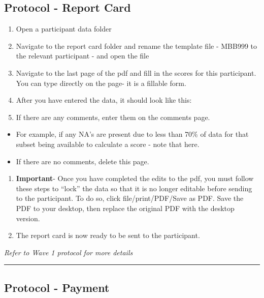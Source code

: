 \documentclass[]{book}
\begin{document}
\hypertarget{protocol---report-card-1}{%
\subsection{Protocol - Report Card}\label{protocol---report-card-1}}

\begin{enumerate}
\def\labelenumi{\arabic{enumi}.}
\item
  Open a participant data folder
\item
  Navigate to the report card folder and rename the template file - MBB999 to the relevant participant - and open the file
\item
  Navigate to the last page of the pdf and fill in the scores for this participant. You can type directly on the page- it is a fillable form.
\item
  After you have entered the data, it should look like this:
\item
  If there are any comments, enter them on the comments page.
\end{enumerate}

\begin{itemize}
\item
  For example, if any NA's are present due to less than 70\% of data for that subset being available to calculate a score - note that here.
\item
  If there are no comments, delete this page.
\end{itemize}

\begin{enumerate}
\def\labelenumi{\arabic{enumi}.}
\setcounter{enumi}{5}
\item
  \textbf{Important}- Once you have completed the edits to the pdf, you must follow these steps to ``lock'' the data so that it is no longer editable before sending to the participant. To do so, click file/print/PDF/Save as PDF. Save the PDF to your desktop, then replace the original PDF with the desktop version.
\item
  The report card is now ready to be sent to the participant.
\end{enumerate}

\emph{Refer to Wave 1 protocol for more details}

\begin{center}\rule{0.5\linewidth}{0.5pt}\end{center}

\hypertarget{protocol---payment-3}{%
\subsection{Protocol - Payment}\label{protocol---payment-3}}
\end{document}
